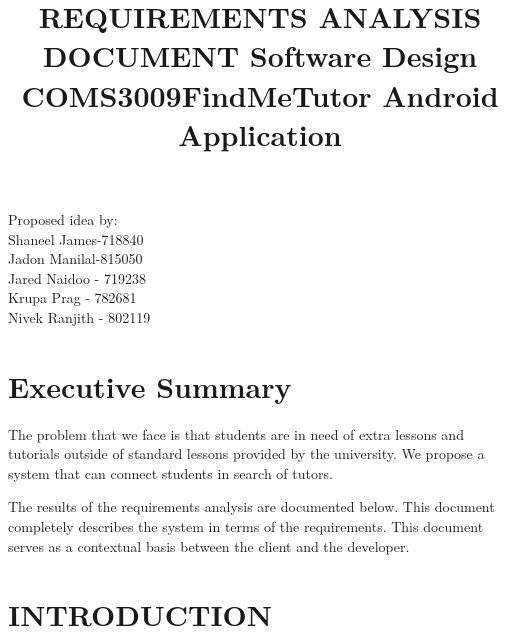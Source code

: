 \documentclass[12pt]{article}
\begin{document}
\title{\textbf{REQUIREMENTS ANALYSIS DOCUMENT }}
\maketitle

\begin{center}
\title{\textbf{Software Design COMS3009}}

\maketitle
\end{center}
\begin{center}
\title{\textbf{FindMeTutor Android Application}}
\maketitle

\end{center}

\begin{center}
Proposed idea by:\\
Shaneel James-718840
\\Jadon Manilal-815050
\\Jared Naidoo - 719238
\\Krupa Prag - 782681
\\Nivek Ranjith - 802119
\end{center}



\newpage
\tableofcontents
\newpage


\section{\textbf{Executive Summary}}
\begin{flushleft}
The problem that we face is that students are in need of extra lessons and tutorials outside of standard lessons provided by the university. We propose a system that can connect students in search of tutors.

The results of the requirements analysis are documented below. This document completely describes the system in terms of the requirements. This document serves as a contextual basis between the client and the developer.
\end{flushleft}
\newpage

\section{INTRODUCTION}
\end{document}
